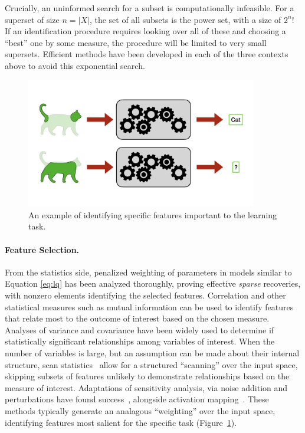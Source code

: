 Crucially, an uninformed search for a subset is computationally infeasible. For a superset of size $n=|X|$, the set of all subsets is the power set, with a size of $2^{n}$! If an identification procedure requires looking over all of these and choosing a ``best'' one by some measure, the procedure will be limited to very small supersets.
Efficient methods have been developed in each of the three contexts above to avoid this exponential search.

\begin{figure}
    \centering
    \includegraphics[trim={0 3cm 0 3cm},clip,width=0.9\textwidth]{1_intro/figs/feat_select.png}
    \caption[Visualization of feature selection]{An example of identifying specific features important to the learning task.}
    \label{fig:feat_select}
\end{figure}
\paragraph{Feature Selection.} 
From the statistics side,
penalized weighting of parameters in models similar to Equation \eqref{eq:lq} has been
analyzed thoroughly, proving effective \textit{sparse} recoveries, with
nonzero elements identifying the selected features.
Correlation and other statistical measures such as mutual information can be used to 
identify features that relate most to the outcome of interest
based on the chosen measure.
Analyses of variance and covariance
have been widely used to determine 
if statistically significant relationships
among variables of interest.
When the number of variables is large,
but an assumption can be made about their
internal structure,
scan statistics~\citep{scanstat,scanstatlrt} allow for a structured ``scanning'' over the input space, skipping subsets of features unlikely to demonstrate relationships based on the measure of interest.
Adaptations of sensitivity analysis, via noise addition and perturbations have found success~\citep{yeung2010sensitivity,zhang2015sensitivity}, alongside activation mapping~\citep{cam,selvaraju2017grad}.
These methods typically generate an analagous ``weighting'' over the input space, identifying features most salient for the specific task (Figure~\ref{fig:feat_select}).


